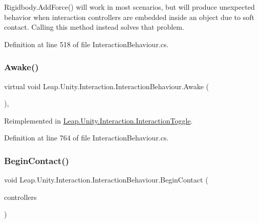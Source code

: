 Rigidbody.\+Add\+Force() will work in most scenarios, but will produce unexpected behavior when interaction controllers are embedded inside an object due to soft contact. Calling this method instead solves that problem. 

Definition at line 518 of file Interaction\+Behaviour.\+cs.

\mbox{\label{class_leap_1_1_unity_1_1_interaction_1_1_interaction_behaviour_a977d761c28ec527aedebd97ce9f8b981}} 
\subsubsection{\texorpdfstring{Awake()}{Awake()}}
{\footnotesize\ttfamily virtual void Leap.\+Unity.\+Interaction.\+Interaction\+Behaviour.\+Awake (\begin{DoxyParamCaption}{ }\end{DoxyParamCaption})\hspace{0.3cm}{\ttfamily [protected]}, {\ttfamily [virtual]}}



Reimplemented in \mbox{\hyperlink{class_leap_1_1_unity_1_1_interaction_1_1_interaction_toggle_ad2840a310771196cfe8e13b6e21e0fdd}{Leap.\+Unity.\+Interaction.\+Interaction\+Toggle}}.



Definition at line 764 of file Interaction\+Behaviour.\+cs.

\mbox{\label{class_leap_1_1_unity_1_1_interaction_1_1_interaction_behaviour_afe37f016395a6c5834a9c51aab533a35}} 
\subsubsection{\texorpdfstring{BeginContact()}{BeginContact()}}
{\footnotesize\ttfamily void Leap.\+Unity.\+Interaction.\+Interaction\+Behaviour.\+Begin\+Contact (\begin{DoxyParamCaption}\item[{List$<$ \mbox{\hyperlink{class_leap_1_1_unity_1_1_interaction_1_1_interaction_controller}{Interaction\+Controller}} $>$}]{controllers }\end{DoxyParamCaption})}



